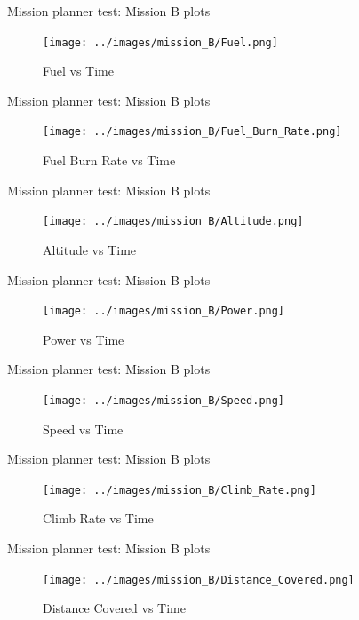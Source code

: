 \documentclass{beamer}
\begin{document}
\begin{frame}{Mission planner test: Mission B plots}
  \begin{figure}
    \centering
    \texttt{[image: ../images/mission\_B/Fuel.png]}
    \caption{Fuel vs Time}
  \end{figure}
\end{frame}

\begin{frame}{Mission planner test: Mission B plots}
  \begin{figure}
    \centering
    \texttt{[image: ../images/mission\_B/Fuel\_Burn\_Rate.png]}
    \caption{Fuel Burn Rate vs Time}
  \end{figure}
\end{frame}

\begin{frame}{Mission planner test: Mission B plots}
  \begin{figure}
    \centering
    \texttt{[image: ../images/mission\_B/Altitude.png]}
    \caption{Altitude vs Time}
  \end{figure}

\end{frame}

\begin{frame}{Mission planner test: Mission B plots}
  \begin{figure}
    \centering
    \texttt{[image: ../images/mission\_B/Power.png]}
    \caption{Power vs Time}
  \end{figure}
\end{frame}

\begin{frame}{Mission planner test: Mission B plots}
  \begin{figure}
    \centering
    \texttt{[image: ../images/mission\_B/Speed.png]}
    \caption{Speed vs Time}
  \end{figure}
\end{frame}

\begin{frame}{Mission planner test: Mission B plots}
  \begin{figure}
    \centering
    \texttt{[image: ../images/mission\_B/Climb\_Rate.png]}
    \caption{Climb Rate vs Time}
  \end{figure}
\end{frame}

\begin{frame}{Mission planner test: Mission B plots}
  \begin{figure}
    \centering
    \texttt{[image: ../images/mission\_B/Distance\_Covered.png]}
    \caption{Distance Covered vs Time}
  \end{figure}
\end{frame}
\end{document}
